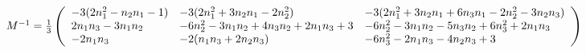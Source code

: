 \documentclass[main.tex]{subfiles}
\begin{document}
\footnotesize
$M^{-1} =\frac{1}{3} \eqmatrix{lll}{
        -3 (2 n_1^2 - n_2 n_1 - 1) & -3 (2 n_1^2 + 3 n_2 n_1 - 2 n_2^2)               & -3 (2 n_1^2 + 3 n_2 n_1 + 6 n_3 n_1 - 2 n_2^2 - 3 n_2 n_3) \\
                2 n_1 n_3 - 3 n_1 n_2 & -6 n_2^2 - 3 n_1 n_2 + 4 n_3 n_2 + 2 n_1 n_3 + 3 & -6 n_2^2 - 3 n_1 n_2 - 5 n_3 n_2 + 6 n_3^2 + 2 n_1 n_3 \\
                        -2 n_1 n_3 & -2 (n_1 n_3 + 2 n_2 n_3)                         & -6 n_3^2 - 2 n_1 n_3 - 4 n_2 n_3 + 3}$
\end{document}

